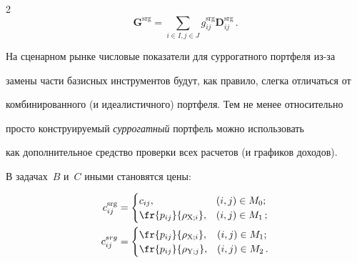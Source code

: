 \begin{multicols}{2}
  \begin{equation}


  \boldsymbol{G}^{\mathrm{srg}}=\sum\limits_{i\in I, j\in J} g_{ij}^{\mathrm{srg}} 


\boldsymbol{D}_{ij}^{\mathrm{srg}}\,.


  \label{e18-ags}


  \end{equation}


  


  На сценарном рынке числовые показатели для суррогатного портфеля из-за 


замены части базисных инструментов будут, как правило, слегка отличаться от 


комбинированного (и идеалистичного) портфеля. Тем не менее относительно 


просто конструируемый \textit{суррогатный} портфель можно использовать 


как дополнительное средство проверки всех расчетов (и графиков доходов). 


  


  В задачах~$B$ и~$C$ иными становятся цены: 


  \begin{align*}


  c_{ij}^{\mathrm{srg}} &= %


  \begin{cases}


  c_{ij}, &(i,j)\in M_0;\\


  \fr{p_{ij}}{\rho_{\mathrm{X};i}}, & (i,j)\in M_1\,;


    \end{cases}%


    \\


  c_{ij}^{srg} &= 




  \begin{cases}


  \fr{p_{ij}}{\rho_{\mathrm{X};i}},& (i,j)\in M_1;\\


\fr{p_{ij}}{\rho_{\mathrm{Y};j}}, &(i,j)\in M_2\,.


\end{cases}




  \end{align*}



\end{multicols}
